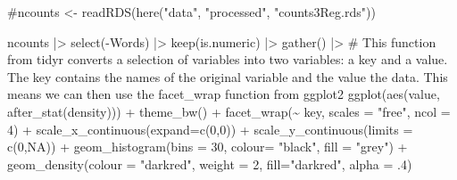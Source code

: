 \documentclass[
  letterpaper,
  DIV=11,
  numbers=noendperiod]{scrreprt}
\newenvironment{Shaded}{\begin{snugshade}}{\end{snugshade}}
\newcommand{\AttributeTok}[1]{\textcolor[rgb]{0.40,0.45,0.13}{#1}}
\newcommand{\CommentTok}[1]{\textcolor[rgb]{0.37,0.37,0.37}{#1}}
\newcommand{\ConstantTok}[1]{\textcolor[rgb]{0.56,0.35,0.01}{#1}}
\newcommand{\DecValTok}[1]{\textcolor[rgb]{0.68,0.00,0.00}{#1}}
\newcommand{\FunctionTok}[1]{\textcolor[rgb]{0.28,0.35,0.67}{#1}}
\newcommand{\NormalTok}[1]{\textcolor[rgb]{0.00,0.23,0.31}{#1}}
\newcommand{\SpecialCharTok}[1]{\textcolor[rgb]{0.37,0.37,0.37}{#1}}
\newcommand{\StringTok}[1]{\textcolor[rgb]{0.13,0.47,0.30}{#1}}
\begin{document}
\begin{Shaded}
\begin{Highlighting}[]
\CommentTok{\#ncounts \textless{}{-} readRDS(here("data", "processed", "counts3Reg.rds"))}

\NormalTok{ncounts }\SpecialCharTok{|\textgreater{}}
  \FunctionTok{select}\NormalTok{(}\SpecialCharTok{{-}}\NormalTok{Words) }\SpecialCharTok{|\textgreater{}} 
  \FunctionTok{keep}\NormalTok{(is.numeric) }\SpecialCharTok{|\textgreater{}} 
  \FunctionTok{gather}\NormalTok{() }\SpecialCharTok{|\textgreater{}} \CommentTok{\# This function from tidyr converts a selection of variables into two variables: a key and a value. The key contains the names of the original variable and the value the data. This means we can then use the facet\_wrap function from ggplot2}
  \FunctionTok{ggplot}\NormalTok{(}\FunctionTok{aes}\NormalTok{(value, }\FunctionTok{after\_stat}\NormalTok{(density))) }\SpecialCharTok{+}
    \FunctionTok{theme\_bw}\NormalTok{() }\SpecialCharTok{+}
    \FunctionTok{facet\_wrap}\NormalTok{(}\SpecialCharTok{\textasciitilde{}}\NormalTok{ key, }\AttributeTok{scales =} \StringTok{"free"}\NormalTok{, }\AttributeTok{ncol =} \DecValTok{4}\NormalTok{) }\SpecialCharTok{+}
    \FunctionTok{scale\_x\_continuous}\NormalTok{(}\AttributeTok{expand=}\FunctionTok{c}\NormalTok{(}\DecValTok{0}\NormalTok{,}\DecValTok{0}\NormalTok{)) }\SpecialCharTok{+}
    \FunctionTok{scale\_y\_continuous}\NormalTok{(}\AttributeTok{limits =} \FunctionTok{c}\NormalTok{(}\DecValTok{0}\NormalTok{,}\ConstantTok{NA}\NormalTok{)) }\SpecialCharTok{+}
    \FunctionTok{geom\_histogram}\NormalTok{(}\AttributeTok{bins =} \DecValTok{30}\NormalTok{, }\AttributeTok{colour=} \StringTok{"black"}\NormalTok{, }\AttributeTok{fill =} \StringTok{"grey"}\NormalTok{) }\SpecialCharTok{+}
    \FunctionTok{geom\_density}\NormalTok{(}\AttributeTok{colour =} \StringTok{"darkred"}\NormalTok{, }\AttributeTok{weight =} \DecValTok{2}\NormalTok{, }\AttributeTok{fill=}\StringTok{"darkred"}\NormalTok{, }\AttributeTok{alpha =}\NormalTok{ .}\DecValTok{4}\NormalTok{)}
\end{Highlighting}
\end{Shaded}
\end{document}
